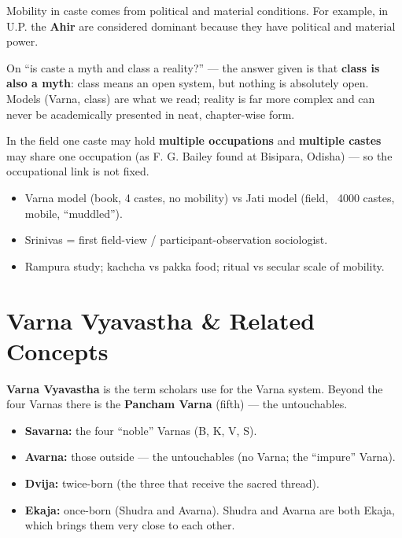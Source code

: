 Mobility in caste comes from political and material conditions. For example, in U.P. the \textbf{Ahir} are considered dominant because they have political and material power.

\begin{CriticalPoint}
On ``is caste a myth and class a reality?'' --- the answer given is that \textbf{class is also a myth}: class means an open system, but nothing is absolutely open. Models (Varna, class) are what we read; reality is far more complex and can never be academically presented in neat, chapter-wise form.
\end{CriticalPoint}

\begin{ExampleBox}
In the field one caste may hold \textbf{multiple occupations} and \textbf{multiple castes} may share one occupation (as F. G. Bailey found at Bisipara, Odisha) --- so the occupational link is not fixed.
\end{ExampleBox}

\begin{QuickRevision}
\begin{itemize}
\item Varna model (book, 4 castes, no mobility) vs Jati model (field, ~4000 castes, mobile, ``muddled'').
\item Srinivas = first field-view / participant-observation sociologist.
\item Rampura study; kachcha vs pakka food; ritual vs secular scale of mobility.
\end{itemize}
\end{QuickRevision}

\section{Varna Vyavastha \& Related Concepts}

\textbf{Varna Vyavastha} is the term scholars use for the Varna system. Beyond the four Varnas there is the \textbf{Pancham Varna} (fifth) --- the untouchables.

\begin{KeyConcept}
\begin{itemize}
\item \textbf{Savarna:} the four ``noble'' Varnas (B, K, V, S).
\item \textbf{Avarna:} those outside --- the untouchables (no Varna; the ``impure'' Varna).
\item \textbf{Dvija:} twice-born (the three that receive the sacred thread).
\item \textbf{Ekaja:} once-born (Shudra and Avarna). Shudra and Avarna are both Ekaja, which brings them very close to each other.
\end{itemize}
\end{KeyConcept}


